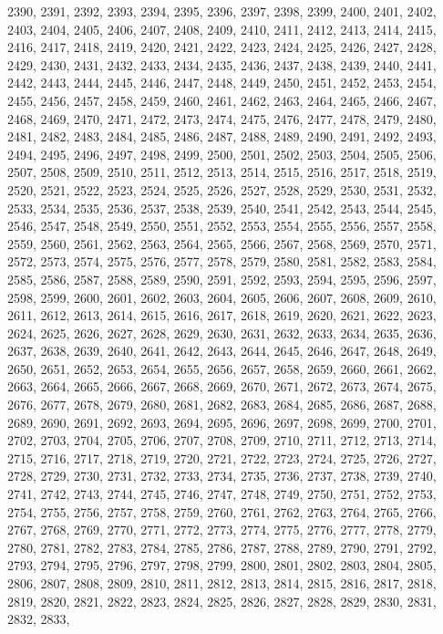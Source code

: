 \documentclass[a4paper,11pt]{article}
\numberwithin{equation}{section}
\begin{document}
2390, 2391, 2392, 2393, 2394, 2395, 2396, 2397, 2398, 2399, 2400, 2401,
2402, 2403, 2404, 2405, 2406, 2407, 2408, 2409, 2410, 2411, 2412, 2413,
2414, 2415, 2416, 2417, 2418, 2419, 2420, 2421, 2422, 2423, 2424, 2425,
2426, 2427, 2428, 2429, 2430, 2431, 2432, 2433, 2434, 2435, 2436, 2437,
2438, 2439, 2440, 2441, 2442, 2443, 2444, 2445, 2446, 2447, 2448, 2449,
2450, 2451, 2452, 2453, 2454, 2455, 2456, 2457, 2458, 2459, 2460, 2461,
2462, 2463, 2464, 2465, 2466, 2467, 2468, 2469, 2470, 2471, 2472, 2473,
2474, 2475, 2476, 2477, 2478, 2479, 2480, 2481, 2482, 2483, 2484, 2485,
2486, 2487, 2488, 2489, 2490, 2491, 2492, 2493, 2494, 2495, 2496, 2497,
2498, 2499, 2500, 2501, 2502, 2503, 2504, 2505, 2506, 2507, 2508, 2509,
2510, 2511, 2512, 2513, 2514, 2515, 2516, 2517, 2518, 2519, 2520, 2521,
2522, 2523, 2524, 2525, 2526, 2527, 2528, 2529, 2530, 2531, 2532, 2533,
2534, 2535, 2536, 2537, 2538, 2539, 2540, 2541, 2542, 2543, 2544, 2545,
2546, 2547, 2548, 2549, 2550, 2551, 2552, 2553, 2554, 2555, 2556, 2557,
2558, 2559, 2560, 2561, 2562, 2563, 2564, 2565, 2566, 2567, 2568, 2569,
2570, 2571, 2572, 2573, 2574, 2575, 2576, 2577, 2578, 2579, 2580, 2581,
2582, 2583, 2584, 2585, 2586, 2587, 2588, 2589, 2590, 2591, 2592, 2593,
2594, 2595, 2596, 2597, 2598, 2599, 2600, 2601, 2602, 2603, 2604, 2605,
2606, 2607, 2608, 2609, 2610, 2611, 2612, 2613, 2614, 2615, 2616, 2617,
2618, 2619, 2620, 2621, 2622, 2623, 2624, 2625, 2626, 2627, 2628, 2629,
2630, 2631, 2632, 2633, 2634, 2635, 2636, 2637, 2638, 2639, 2640, 2641,
2642, 2643, 2644, 2645, 2646, 2647, 2648, 2649, 2650, 2651, 2652, 2653,
2654, 2655, 2656, 2657, 2658, 2659, 2660, 2661, 2662, 2663, 2664, 2665,
2666, 2667, 2668, 2669, 2670, 2671, 2672, 2673, 2674, 2675, 2676, 2677,
2678, 2679, 2680, 2681, 2682, 2683, 2684, 2685, 2686, 2687, 2688, 2689,
2690, 2691, 2692, 2693, 2694, 2695, 2696, 2697, 2698, 2699, 2700, 2701,
2702, 2703, 2704, 2705, 2706, 2707, 2708, 2709, 2710, 2711, 2712, 2713,
2714, 2715, 2716, 2717, 2718, 2719, 2720, 2721, 2722, 2723, 2724, 2725,
2726, 2727, 2728, 2729, 2730, 2731, 2732, 2733, 2734, 2735, 2736, 2737,
2738, 2739, 2740, 2741, 2742, 2743, 2744, 2745, 2746, 2747, 2748, 2749,
2750, 2751, 2752, 2753, 2754, 2755, 2756, 2757, 2758, 2759, 2760, 2761,
2762, 2763, 2764, 2765, 2766, 2767, 2768, 2769, 2770, 2771, 2772, 2773,
2774, 2775, 2776, 2777, 2778, 2779, 2780, 2781, 2782, 2783, 2784, 2785,
2786, 2787, 2788, 2789, 2790, 2791, 2792, 2793, 2794, 2795, 2796, 2797,
2798, 2799, 2800, 2801, 2802, 2803, 2804, 2805, 2806, 2807, 2808, 2809,
2810, 2811, 2812, 2813, 2814, 2815, 2816, 2817, 2818, 2819, 2820, 2821,
2822, 2823, 2824, 2825, 2826, 2827, 2828, 2829, 2830, 2831, 2832, 2833,
\end{document}
